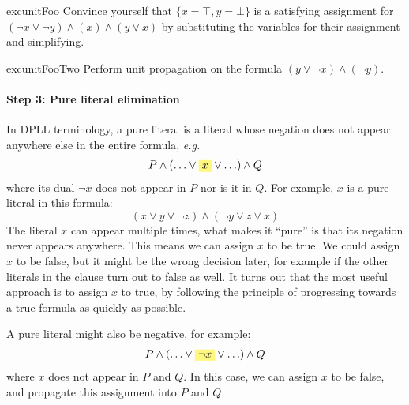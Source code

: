 \documentclass{article}
\theoremstyle{definition}
\newcommand{\eg}{\emph{e.g.}}
\newcommand{\highlight}[1]{%
  \colorbox{yellow!50}{$\displaystyle#1$}}
\begin{document}
\begin{restatable}{exc}{unitFoo}
Convince yourself that $\{x = \top, y = \bot\}$ is a satisfying
assignment for $(\neg x \vee \neg y) \wedge (x)
\wedge (y \vee x)$ by substituting the variables 
for their assignment and simplifying.
\end{restatable}

\begin{restatable}{exc}{unitFooTwo}
Perform unit propagation on the formula $(y \vee \neg x)
\wedge (\neg y)$.
\end{restatable}

\paragraph{Step 3: Pure literal elimination}

In DPLL terminology, a pure literal is a literal whose
negation does not appear anywhere else in the entire formula, \eg{}
%
\begin{align*}
P \wedge (\ldots \vee \highlight{x} \vee \ldots) \wedge Q
\end{align*}
%
where its dual $\neg x$ does not appear in $P$ nor is it in $Q$.
For example, $x$ is a pure literal in this formula:
%
\begin{equation*}
(x \vee y \vee \neg z) \wedge (\neg y \vee z \vee x)
\end{equation*}
%
The literal $x$ can appear multiple times, what makes it ``pure'' is
that its negation never appears anywhere. This means we can assign $x$
to be true. We could assign $x$ to be false, but it might be the wrong
decision later, for example if the other literals in the clause turn
out to false as well. It turns out that the most useful approach is to
assign $x$ to true, by following the principle of progressing towards
a true formula as quickly as possible.

A pure literal might also be negative, for example:
\begin{align*}
P \wedge (\ldots \vee \highlight{\neg x} \vee \ldots) \wedge Q
\end{align*}
where $x$ does not appear in $P$ and $Q$. In this case, we can assign
$x$ to be false, and propagate this assignment into $P$ and $Q$.
\end{document}
